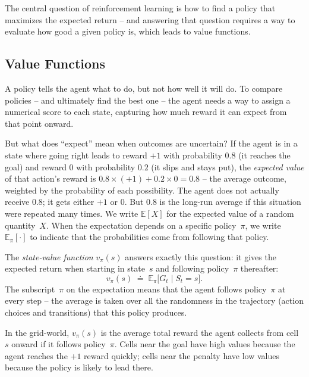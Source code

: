 \smallskip
The central question of reinforcement learning is how to find a
policy that maximizes the expected return -- and answering that
question requires a way to evaluate how good a given policy is,
which leads to value functions.

\subsection{Value Functions}
\label{subsec:value-functions}

A policy tells the agent what to do, but not how well it will do.
To compare policies -- and ultimately find the best one -- the
agent needs a way to assign a numerical score to each state,
capturing how much reward it can expect from that point onward.

\smallskip
But what does ``expect'' mean when outcomes are uncertain? If the
agent is in a state where going right leads to reward $+1$ with
probability $0.8$ (it reaches the goal) and reward $0$ with
probability $0.2$ (it slips and stays put), the
\emph{expected value} of that action's reward is
$0.8 \times (+1) + 0.2 \times 0 = 0.8$ -- the average outcome,
weighted by the probability of each possibility. The agent does
not actually receive $0.8$; it gets either $+1$ or $0$. But $0.8$
is the long-run average if this situation were repeated many times.
We write $\mathbb{E}[X]$ for the expected value of a random
quantity~$X$. When the expectation depends on a specific
policy~$\pi$, we write $\mathbb{E}_\pi[\cdot]$ to indicate that
the probabilities come from following that policy.

\smallskip
The \emph{state-value function} $v_\pi(s)$ answers exactly this
question: it gives the expected return when starting in state~$s$
and following policy~$\pi$ thereafter:
%
\begin{equation}
\label{eq:v-pi}
v_\pi(s) \;\doteq\; \mathbb{E}_\pi\!\big[G_t \mid S_t = s\big].
\end{equation}
%
The subscript~$\pi$ on the expectation means that the agent
follows policy~$\pi$ at every step -- the average is taken over
all the randomness in the trajectory (action choices and
transitions) that this policy produces.

\smallskip
In the grid-world, $v_\pi(s)$ is the average total reward the
agent collects from cell~$s$ onward if it follows policy~$\pi$.
Cells near the goal have high values because the agent reaches
the $+1$ reward quickly; cells near the penalty have low values
because the policy is likely to lead there.

